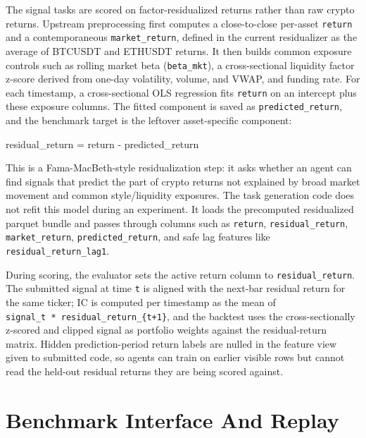 \documentclass[
]{article}
\newenvironment{Shaded}{}{}
\newcommand{\NormalTok}[1]{#1}
\begin{document}
The signal tasks are scored on factor-residualized returns rather than raw crypto returns. Upstream preprocessing first computes a close-to-close per-asset \texttt{return} and a contemporaneous \texttt{market\_return}, defined in the current residualizer as the average of BTCUSDT and ETHUSDT returns. It then builds common exposure controls such as rolling market beta (\texttt{beta\_mkt}), a cross-sectional liquidity factor z-score derived from one-day volatility, volume, and VWAP, and funding rate. For each timestamp, a cross-sectional OLS regression fits \texttt{return} on an intercept plus these exposure columns. The fitted component is saved as \texttt{predicted\_return}, and the benchmark target is the leftover asset-specific component:

\begin{Shaded}
\begin{Highlighting}[]
\NormalTok{residual\_return = return {-} predicted\_return}
\end{Highlighting}
\end{Shaded}

This is a Fama-MacBeth-style residualization step: it asks whether an agent can find signals that predict the part of crypto returns not explained by broad market movement and common style/liquidity exposures. The task generation code does not refit this model during an experiment. It loads the precomputed residualized parquet bundle and passes through columns such as \texttt{return}, \texttt{residual\_return}, \texttt{market\_return}, \texttt{predicted\_return}, and safe lag features like \texttt{residual\_return\_lag1}.

During scoring, the evaluator sets the active return column to \texttt{residual\_return}. The submitted signal at time \texttt{t} is aligned with the next-bar residual return for the same ticker; IC is computed per timestamp as the mean of \texttt{signal\_t\ *\ residual\_return\_\{t+1\}}, and the backtest uses the cross-sectionally z-scored and clipped signal as portfolio weights against the residual-return matrix. Hidden prediction-period return labels are nulled in the feature view given to submitted code, so agents can train on earlier visible rows but cannot read the held-out residual returns they are being scored against.

\section{Benchmark Interface And Replay}\label{benchmark-interface-and-replay}
\end{document}
